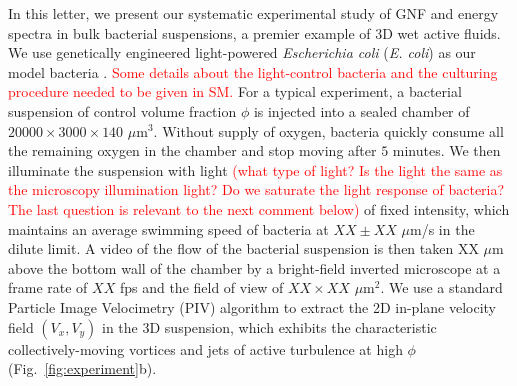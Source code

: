 \documentclass[twocolumn,aps,prl,amsmath,amssymb,longbibliography]{revtex4-2}
\begin{document}
In this letter, we present our systematic experimental study of GNF and energy spectra in bulk bacterial suspensions, a premier example of 3D wet active fluids. We use genetically engineered light-powered \textit{Escherichia coli} (\textit{E. coli}) as our model bacteria \cite{Liu2020}. \textcolor{red}{Some details about the light-control bacteria and the culturing procedure needed to be given in SM.}  For a typical experiment, a bacterial suspension of control volume fraction $\phi$ is injected into a sealed chamber of $20000 \times 3000 \times 140$ $\mu$m$^3$.
Without supply of oxygen, bacteria quickly consume all the remaining oxygen in the chamber and stop moving after $5$ minutes.
We then illuminate the suspension with light \textcolor{red}{(what type of light? Is the light the same as the microscopy illumination light? Do we saturate the light response of bacteria?
The last question is relevant to the next comment below)} of fixed intensity, which maintains an average swimming speed of bacteria at $XX \pm XX$ $\mu$m/s in the dilute limit.
A video of the flow of the bacterial suspension is then taken XX $\mu$m above the bottom wall of the chamber by a bright-field inverted microscope at a frame rate of $XX$ fps and the field of view of $XX \times XX$ $\mu$m$^2$.
We use a standard Particle Image Velocimetry (PIV) algorithm to extract the 2D in-plane velocity field $(V_x,V_y)$ in the 3D suspension, which exhibits the characteristic collectively-moving vortices and jets of active turbulence at high $\phi$ (Fig.~\ref{fig:experiment}b).
\end{document}
